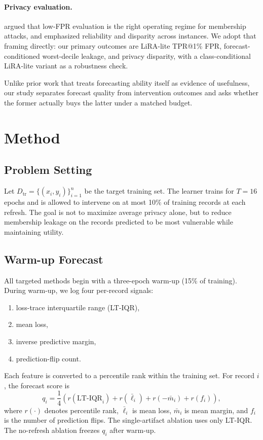\documentclass{article}
\newcommand{\lira}{LiRA-lite}
\begin{document}
\paragraph{Privacy evaluation.}
\citet{carlini2022membership} argued that low-FPR evaluation is the right operating regime for membership attacks, and \citet{wang2025membership} emphasized reliability and disparity across instances. We adopt that framing directly: our primary outcomes are \lira{} TPR@1\% FPR, forecast-conditioned worst-decile leakage, and privacy disparity, with a class-conditional \lira{} variant as a robustness check.

Unlike prior work that treats forecasting ability itself as evidence of usefulness, our study separates forecast quality from intervention outcomes and asks whether the former actually buys the latter under a matched budget.

\section{Method}
\label{sec:method}

\subsection{Problem Setting}

Let $D_{\mathrm{tr}}=\{(x_i, y_i)\}_{i=1}^{n}$ be the target training set. The learner trains for $T=16$ epochs and is allowed to intervene on at most 10\% of training records at each refresh. The goal is not to maximize average privacy alone, but to reduce membership leakage on the records predicted to be most vulnerable while maintaining utility.

\subsection{Warm-up Forecast}

All targeted methods begin with a three-epoch warm-up (15\% of training). During warm-up, we log four per-record signals:
\begin{enumerate}
    \item loss-trace interquartile range (LT-IQR),
    \item mean loss,
    \item inverse predictive margin,
    \item prediction-flip count.
\end{enumerate}
Each feature is converted to a percentile rank within the training set. For record $i$, the forecast score is
\begin{equation}
q_i = \frac{1}{4}\left(r(\mathrm{LT\mbox{-}IQR}_i) + r(\bar{\ell}_i) + r(-\bar{m}_i) + r(f_i)\right),
\end{equation}
where $r(\cdot)$ denotes percentile rank, $\bar{\ell}_i$ is mean loss, $\bar{m}_i$ is mean margin, and $f_i$ is the number of prediction flips. The single-artifact ablation uses only LT-IQR. The no-refresh ablation freezes $q_i$ after warm-up.
\end{document}

